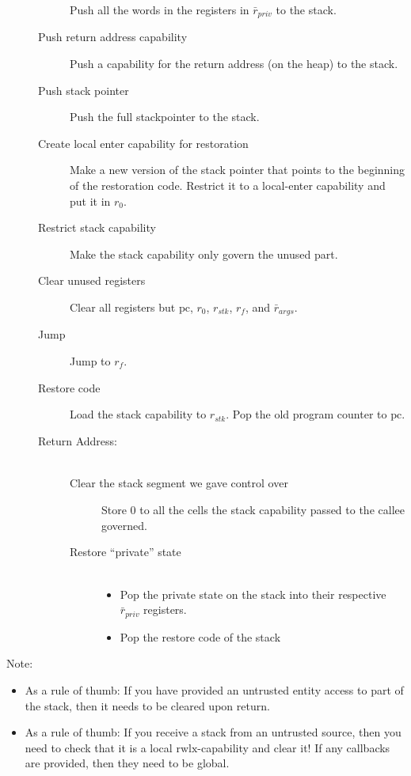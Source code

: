 \documentclass[a4paper]{article}
\newcommand{\forcenewline}{$\phantom{v}$\\}
\newcommand{\var}[1]{\mathit{#1}}
\newcommand{\pcreg}{\mathrm{pc}}
\newcommand{\plainperm}[1]{\mathrm{#1}}
\newcommand{\rwlx}{\plainperm{rwlx}}
\begin{document}
\begin{description}
\begin{description}
    Push all the words in the registers in  $\bar{r}_{\var{priv}}$ to the stack.
  \item [Push return address capability]
    Push a capability for the return address (on the heap) to the stack.
  \item [Push stack pointer]
    Push the full stackpointer to the stack.
  \item [Create local enter capability for restoration]
    Make a new version of the stack pointer that points to the beginning of the restoration code. Restrict it to a local-enter capability and put it in $r_0$.
  \item [Restrict stack capability]
    Make the stack capability only govern the unused part.
  \item [Clear unused registers]
    Clear all registers but $\pcreg$, $r_0$, $r_{\var{stk}}$, $r_f$, and $\bar{r}_{\var{args}}$.
  \item [Jump] Jump to $r_f$.
  \item [Restore code]
    Load the stack capability to $r_{\var{stk}}$. Pop the old program counter to $\pcreg$.
  \item [Return Address:] \forcenewline
    \begin{description}
    \item [Clear the stack segment we gave control over] Store 0 to all the cells the stack capability passed to the callee governed.
    \item [Restore ``private'' state] \forcenewline
      \begin{itemize}
      \item Pop the private state on the stack into their respective $\bar{r}_{\var{priv}}$ registers.
      \item Pop the restore code of the stack
      \end{itemize}
  \end{description}
\end{description}
\end{description}
Note:
\begin{itemize}
\item As a rule of thumb: If you have provided an untrusted entity access to part of the stack, then it needs to be cleared upon return.
\item As a rule of thumb: If you receive a stack from an untrusted source, then you need to check that it is a local $\rwlx$-capability and clear it! If any callbacks are provided, then they need to be global.
\end{itemize}
\end{document}
